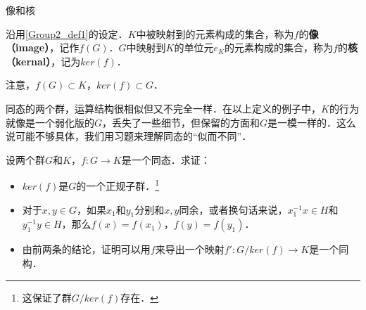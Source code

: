 \begin{definition}{像和核}

沿用\autoref{Group2_def1}的设定．$K$中被映射到的元素构成的集合，称为$f$的\textbf{像（image）}，记作$f(G)$．$G$中映射到$K$的单位元$e_K$的元素构成的集合，称为$f$的\textbf{核（kernal）}，记为$ker(f)$．

\end{definition}

注意，$f(G)\subset K$，$ker(f)\subset G$．

同态的两个群，运算结构很相似但又不完全一样．在以上定义的例子中，$K$的行为就像是一个弱化版的$G$，丢失了一些细节，但保留的方面和$G$是一模一样的．这么说可能不够具体，我们用习题来理解同态的“似而不同”．

\begin{exercise}{}\label{Group2_exe1}
设两个群$G$和$K$，$f:G\rightarrow K$是一个同态．求证：
\begin{itemize}
\item $ker(f)$是$G$的一个正规子群．\footnote{这保证了群$G/ker(f)$存在．}
\item 对于$x, y\in G$，如果$x_1$和$y_1$分别和$x, y$同余，或者换句话来说，$x_1^{-1}x\in H$和$y_1^{-1}y\in H$，那么$f(x)=f(x_1)$，$f(y)=f(y_1)$．
\item 由前两条的结论，证明可以用$f$来导出一个映射$f': G/ker(f)\rightarrow K$是一个同构．

\end{itemize}
\end{exercise}
